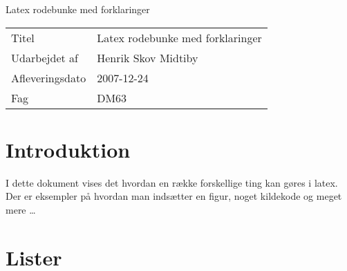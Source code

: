 \documentclass[11pt,a4paper,fleqn]{article}
\title{\titel}
\author{}
\date{}
\numberwithin{equation}{section}
\newcommand{\forfattere}{Henrik Skov Midtiby}
\newcommand{\titel}{Latex rodebunke med forklaringer}
\newcommand{\dato}{2007-12-24}
\newcommand{\fag}{DM63}
\begin{document}
\phantom{g}
\vspace{2.5cm}
\noindent
\begin{Huge}
{\titel}
\end{Huge}
\vspace{11cm}

\begin{tabular}{@{} l l @{}}
\hline
Titel           & \titel                \\
Udarbejdet af   & \forfattere           \\
Afleveringsdato & \dato					\\
Fag      		& \fag					\\
\hline
\end{tabular}
\thispagestyle{empty}
\newpage




\tableofcontents
\listoftodos
\newpage


\section{Introduktion}

I dette dokument vises det hvordan en række forskellige ting kan
gøres i latex. 
%
Der er eksempler på hvordan man indsætter en figur, noget kildekode
og meget mere \ldots

\section{Lister}
\end{document}
